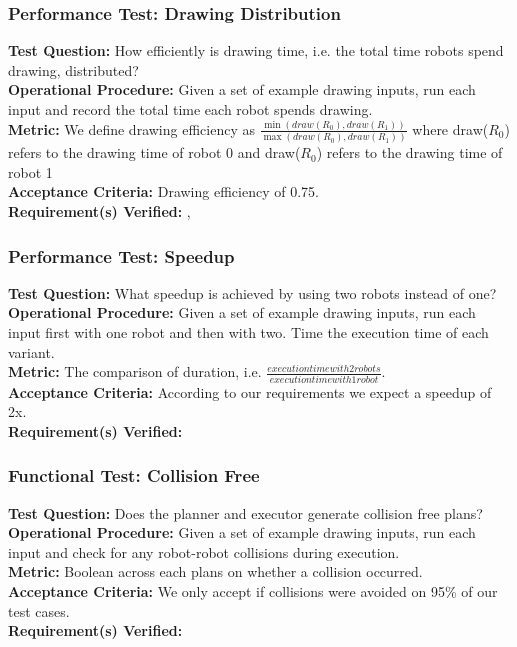 \subsubsection{Performance Test: Drawing Distribution}
\label{sec:sdp_pt_draw}
\textbf{Test Question:} How efficiently is drawing time, i.e. the total time robots spend drawing, distributed? \\
\textbf{Operational Procedure:}  Given a set of example drawing inputs, run each input and record the total time each robot spends drawing. \\
\textbf{Metric:} We define drawing efficiency as $\frac{\min(draw(R_{0}), draw(R_{1}))}{\max(draw(R_{0}), draw(R_{1}))}$ where draw($R_{0}$) refers to the drawing time of robot 0 and draw($R_{0}$) refers to the drawing time of robot 1\\
\textbf{Acceptance Criteria:} Drawing efficiency of 0.75.\\
\textbf{Requirement(s) Verified:} , 

\subsubsection{Performance Test: Speedup}
\label{sec:sdp_pt_speedup}
\textbf{Test Question:} What speedup is achieved by using two robots instead of one?\\
\textbf{Operational Procedure:} Given a set of example drawing inputs, run each input first with one robot and then with two. Time the execution time of each variant.\\
\textbf{Metric:} The comparison of duration, i.e. $\frac{execution time with 2 robots}{execution time with 1 robot}$. \\
\textbf{Acceptance Criteria:} According to our requirements we expect a speedup of 2x. \\
\textbf{Requirement(s) Verified:} 

\subsubsection{Functional Test: Collision Free}
\label{sec:sdp_ft_collision}
\textbf{Test Question:} Does the planner and executor generate collision free plans?\\
\textbf{Operational Procedure:} Given a set of example drawing inputs, run each input and check for any robot-robot collisions during execution. \\
\textbf{Metric:} Boolean across each plans on whether a collision occurred.\\
\textbf{Acceptance Criteria:} We only accept if collisions were avoided on 95\% of our test cases. \\
\textbf{Requirement(s) Verified:} 

